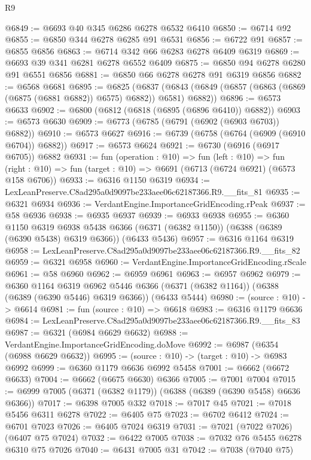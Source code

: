 \begin{lexlean}{R9}
\begin{coremodule}
@6849 := @6693 @40 @345 @6286 @6278 @6532 @6410
@6850 := @6714 @92
@6855 := @6850 @344 @6278 @6285 @91 @6531
@6856 := @6722 @91
@6857 := @6855 @6856
@6863 := @6714 @342 @66 @6283 @6278 @6409 @6319
@6869 := @6693 @39 @341 @6281 @6278 @6552 @6409
@6875 := @6850 @94 @6278 @6280 @91 @6551 @6856
@6881 := @6850 @66 @6278 @6278 @91 @6319 @6856
@6882 := @6568 @6681
@6895 := @6825
    (@6837 (@6843 (@6849 (@6857 (@6863 (@6869 (@6875 (@6881 @6882)) @6575) @6882)) @6581) @6882))
@6896 := @6573 @6633
@6902 := @6800 (@6812 (@6818 (@6895 (@6896 @6410)) @6882))
@6903 := @6573 @6630
@6909 := @6773 (@6785 (@6791 (@6902 (@6903 @6703)) @6882))
@6910 := @6573 @6627
@6916 := @6739 (@6758 (@6764 (@6909 (@6910 @6704)) @6882))
@6917 := @6573 @6624
@6921 := @6730 (@6916 (@6917 @6705)) @6882
@6931 := fun (operation : @10) =>
  fun (left : @10) =>
  fun (right : @10) => fun (target : @10) => @6691 (@6713 (@6724 @6921) (@6573 @158 @6706))
@6933 := @6316 @1150 @6319
@6934 := LexLeanPreserve.C8ad295a0d9097be233aee06c62187366.R9.__fits_81
@6935 := @6321 @6934
@6936 := VerdantEngine.ImportanceGridEncoding.rPeak
@6937 := @58 @6936
@6938 := @6935 @6937
@6939 := @6933 @6938
@6955 := @6360
    @1150
    @6319
    @6938
    @5438
    @6366
    (@6371 (@6382 @1150))
    (@6388 (@6389 (@6390 @5438) @6319 @6366))
    (@6433 @5436)
@6957 := @6316 @1164 @6319
@6958 := LexLeanPreserve.C8ad295a0d9097be233aee06c62187366.R9.__fits_82
@6959 := @6321 @6958
@6960 := VerdantEngine.ImportanceGridEncoding.rScale
@6961 := @58 @6960
@6962 := @6959 @6961
@6963 := @6957 @6962
@6979 := @6360
    @1164
    @6319
    @6962
    @5446
    @6366
    (@6371 (@6382 @1164))
    (@6388 (@6389 (@6390 @5446) @6319 @6366))
    (@6433 @5444)
@6980 := (source : @10) -> @6614
@6981 := fun (source : @10) => @6618
@6983 := @6316 @1179 @6636
@6984 := LexLeanPreserve.C8ad295a0d9097be233aee06c62187366.R9.__fits_83
@6987 := @6321 (@6984 @6629 @6632)
@6988 := VerdantEngine.ImportanceGridEncoding.doMove
@6992 := @6987 (@6354 (@6988 @6629 @6632))
@6995 := (source : @10) -> (target : @10) -> @6983 @6992
@6999 := @6360 @1179 @6636 @6992 @5458
@7001 := @6662 (@6672 @6633)
@7004 := @6662 (@6675 @6630) @6366
@7005 := @7001 @7004
@7015 := @6999 @7005 (@6371 (@6382 @1179)) (@6388 (@6389 (@6390 @5458) @6636 @6366))
@7017 := @6398 @7005 @332
@7018 := @7017 @45
@7021 := @7018 @5456 @6311 @6278
@7022 := @6405 @75
@7023 := @6702 @6412
@7024 := @6701 @7023
@7026 := @6405 @7024 @6319
@7031 := @7021 (@7022 @7026) (@6407 @75 @7024)
@7032 := @6422 @7005
@7038 := @7032 @76 @5455 @6278 @6310 @75 @7026
@7040 := @6431 @7005 @31
@7042 := @7038 (@7040 @75)

\end{coremodule}
\end{lexlean}
